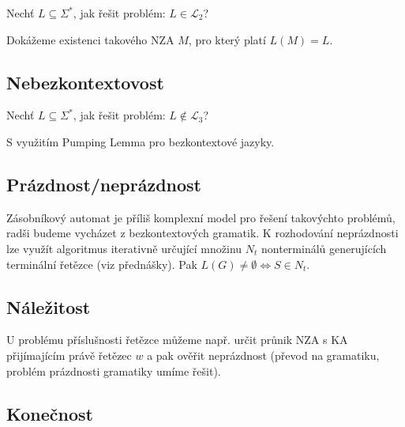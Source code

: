 \begin{compactitem}
    \item Nechť $L \subseteq \Sigma^*$, jak řešit problém: $L \in \mathcal{L}_2$? \begin{compactitem}

        \item Dokážeme existenci takového NZA $M$, pro který platí $L(M) = L$.

    \end{compactitem}
\end{compactitem}

\subsection{Nebezkontextovost}

\begin{compactitem}
    \item Nechť $L \subseteq \Sigma^*$, jak řešit problém: $L \not\in \mathcal{L}_3$? \begin{compactitem}

        \item S využitím Pumping Lemma pro bezkontextové jazyky.

    \end{compactitem}
\end{compactitem}

\subsection{Prázdnost/neprázdnost}

Zásobníkový automat je příliš komplexní model pro řešení takovýchto problémů, radši budeme vycházet z bezkontextových gramatik. K rozhodování neprázdnosti lze využít algoritmus iterativně určující množinu $N_t$ nonterminálů generujících terminální řetězce (viz přednášky). Pak $L(G) \not= \emptyset \Leftrightarrow S \in N_t$.

\subsection{Náležitost}

U problému příslušnosti řetězce můžeme např. určit průnik NZA s KA přijímajícím právě řetězec $w$ a pak ověřit neprázdnost (převod na gramatiku, problém prázdnosti gramatiky umíme řešit).

\subsection{Konečnost}

